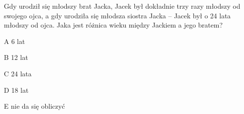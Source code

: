 \begin{tresc}
Gdy urodził się młodszy brat Jacka, Jacek był dokładnie trzy razy młodszy od swojego ojca, a gdy urodziła się młodsza siostra Jacka – Jacek był o 24 lata młodszy od ojca. Jaka jest różnica wieku między Jackiem a jego bratem?
\end{tresc}
\begin{wariant}{A} 6 lat \end{wariant}
\begin{wariant}{B} 12 lat \end{wariant}
\begin{wariant}{C} 24 lata \end{wariant}
\begin{wariant}{D} 18 lat \end{wariant}
\begin{wariant}{E} nie da się obliczyć \end{wariant}
